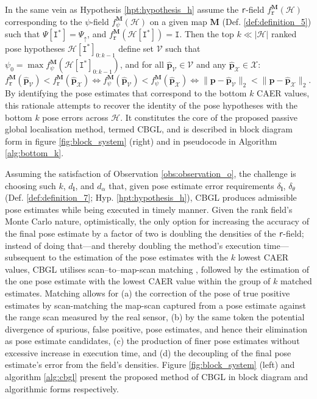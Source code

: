 In the same vein as Hypothesis \ref{hpt:hypothesis_h} assume the \texttt{r}-field
$f_{\texttt{r}}^{\bm{M}}(\mathcal{H})$ corresponding to the $\psi$-field
$f_{\psi}^{\bm{M}}(\mathcal{H})$ on a given map $\bm{M}$ (Def.
\ref{def:definition_5}) such that $\Psi[\texttt{I}^{\ast}] = \Psi_\uparrow$,
and $f_{\texttt{r}}^{\bm{M}}(\mathcal{H}[\texttt{I}^{\ast}]) = \texttt{I}$.
Then the top $k \ll |\mathcal{H}|$ ranked pose hypotheses
$\mathcal{H}[\texttt{I}^{\ast}]_{0:k-1}$ define set $\mathcal{V}$ such that
$\psi_0 = \max f_{\psi}^{\bm{M}}(\mathcal{H}[\texttt{I}^{\ast}]_{0:k-1})$,
and for all $\hat{\bm{p}}_\mathcal{V} \in \mathcal{V}$
and any $\hat{\bm{p}}_{\mathcal{X}} \in \mathcal{X}$:
$ f_{\texttt{r}}^{\bm{M}}(\hat{\bm{p}}_\mathcal{V}) < f_{\texttt{r}}^{\bm{M}}(\hat{\bm{p}}_{\mathcal{X}}) \Leftrightarrow
f_{\psi}^{\bm{M}}(\hat{\bm{p}}_\mathcal{V}) < f_{\psi}^{\bm{M}}(\hat{\bm{p}}_\mathcal{X}) \Leftrightarrow
\|\bm{p}-\hat{\bm{p}}_\mathcal{V}\|_2 < \|\bm{p}-\hat{\bm{p}}_{\mathcal{X}}\|_2$.
By identifying the pose estimates that correspond to the bottom $k$ CAER
values, this rationale attempts to recover the identity of the pose hypotheses
with the bottom $k$ pose errors across $\mathcal{H}$. It constitutes the core
of the proposed passive global localisation method, termed CBGL, and is
described
in block diagram form in figure \ref{fig:block_system} (right) and
in pseudocode in Algorithm \ref{alg:bottom_k}.

Assuming the satisfaction of Observation \ref{obs:observation_o}, the challenge
is choosing such $k$, $d_{\bm{l}}$, and $d_\alpha$ that, given pose estimate
error requirements $\delta_{\bm{l}}$, $\delta_{\theta}$ (Def.
\ref{def:definition_7}; Hyp.  \ref{hpt:hypothesis_h}), CBGL produces admissible
pose estimates while being executed in timely manner.  Given the rank field's
Monte Carlo nature, optimistically, the only option for increasing the accuracy
of the final pose estimate by a factor of two is doubling the densities of the
\texttt{r}-field; instead of doing that---and thereby doubling the method's
execution time---subsequent to the estimation of the pose estimates with the
$k$ lowest CAER values, CBGL utilises scan--to--map-scan matching
\cite{Vasiljevic2016c,Filotheou2023a}, followed by the estimation of the one
pose estimate with the lowest CAER value within the group of $k$ matched
estimates.
Matching allows for (a) the correction of the pose of true positive estimates
by scan-matching the map-scan captured from a pose estimate against the range
scan measured by the real sensor, (b) by the same token the potential
divergence of spurious, false positive, pose estimates, and hence their
elimination as pose estimate candidates, (c) the production of finer pose
estimates without excessive increase in execution time, and (d) the decoupling
of the final pose estimate's error from the field's densities.
Figure \ref{fig:block_system} (left) and algorithm \ref{alg:cbgl} present the
proposed method of CBGL in block diagram and algorithmic forms respectively.

